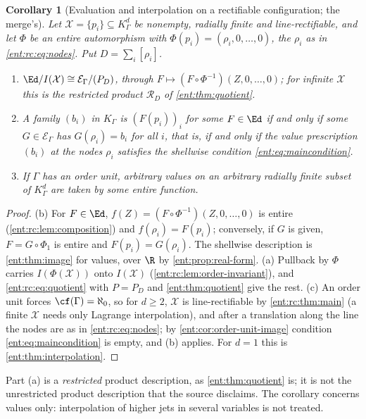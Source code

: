 \documentclass[11pt]{article}
\theoremstyle{plain}
\theoremstyle{plain}
\theoremstyle{plain}
\newtheorem{corollary}[corollary]{Corollary}
\theoremstyle{definition}
\theoremstyle{definition}
\theoremstyle{definition}
\theoremstyle{definition}
\theoremstyle{remark}
\newcommand{\K}{K_\Gamma}\newcommand{\KD}{K_\Delta}
\newcommand{\E}{\mathcal E_\Gamma}
\newcommand{\RD}{\mathcal R_D}\newcommand{\Ucal}{\mathcal U}
\begin{document}
\begin{corollary}[Evaluation and interpolation on a rectifiable
configuration; the merge's]\label{ent:rc:cor:evaluation}
Let $\mathcal X=\{p_i\}\subseteq\K^d$ be nonempty, radially finite and
line-rectifiable, and let $\Phi$ be an entire automorphism with
$\Phi(p_i)=(\rho_i,0,\ldots,0)$, the $\rho_i$ as in \eqref{ent:rc:eq:nodes}.
Put $D=\sum_i[\rho_i]$.
\begin{enumerate}[label=\textnormal{(\alph*)},leftmargin=2em]
\item $\Ed/I(\mathcal X)\cong\E/(P_D)$, through
$F\mapsto(F\circ\Phi^{-1})(Z,0,\ldots,0)$; for infinite $\mathcal X$ this is
the restricted product $\RD$ of \cref{ent:thm:quotient}.
\item A family $(b_i)$ in $\K$ is $(F(p_i))_i$ for some $F\in\Ed$ if and only
if some $G\in\E$ has $G(\rho_i)=b_i$ for all $i$, that is, if and only if the
value prescription $(b_i)$ at the nodes $\rho_i$ satisfies the shellwise
condition \eqref{ent:eq:maincondition}.
\item If $\Gamma$ has an order unit, arbitrary values on an arbitrary radially
finite subset of $\K^d$ are taken by some entire function.
\end{enumerate}
\end{corollary}
\begin{proof}
(b) For $F\in\Ed$, $f(Z)=(F\circ\Phi^{-1})(Z,0,\ldots,0)$ is entire
(\cref{ent:rc:lem:composition}) and $f(\rho_i)=F(p_i)$; conversely, if $G$ is
given, $F=G\circ\Phi_1$ is entire and $F(p_i)=G(\rho_i)$. The shellwise
description is \cref{ent:thm:image} for values, over $\R$ by
\cref{ent:prop:real-form}. (a) Pullback by $\Phi$ carries
$I(\Phi(\mathcal X))$ onto $I(\mathcal X)$ (\cref{ent:rc:lem:order-invariant}),
and \eqref{ent:rc:eq:quotient} with $P=P_D$ and \cref{ent:thm:quotient} give
the rest. (c) An order unit forces $\cf(\Gamma)=\aleph_0$, so for $d\ge2$,
$\mathcal X$ is line-rectifiable by \cref{ent:rc:thm:main} (a finite
$\mathcal X$ needs only Lagrange interpolation), and after a translation along the line the nodes are
as in \eqref{ent:rc:eq:nodes}; by \cref{ent:cor:order-unit-image}
condition \eqref{ent:eq:maincondition} is empty, and (b) applies. For $d=1$
this is \cref{ent:thm:interpolation}.
\end{proof}

Part (a) is a \emph{restricted} product description, as \cref{ent:thm:quotient}
is; it is not the unrestricted product description that the source disclaims.
The corollary concerns values only: interpolation of higher jets in several
variables is not treated.
\end{document}
